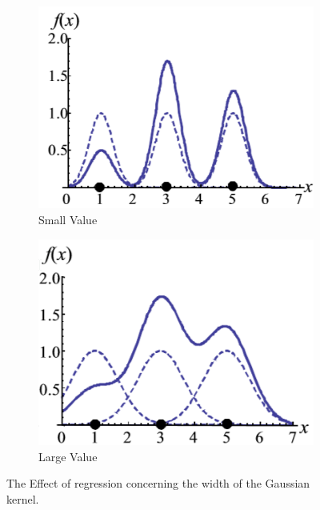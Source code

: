 \begin{figure}
	\centering
	\begin{subfigure}{.5\textwidth}
		\centering
		\includegraphics[width=1\linewidth]{figures/GaussianWidthSmall.png}
		\caption{Small Value \label{FigSmallWidth}}
	\end{subfigure}%
	\begin{subfigure}{.5\textwidth}
		\centering
		\includegraphics[width=1\linewidth]{figures/GaussianWidthLarge.png}
		\caption{Large Value \label{FigLargeWidth}}
	\end{subfigure}
	\caption[Effect of width in Gaussian Kernel for Regression]{The Effect of regression concerning the width of the Gaussian kernel.\cite{Kitayama.2011}}
	\label{FigGaussianWidthRegression}
\end{figure}
